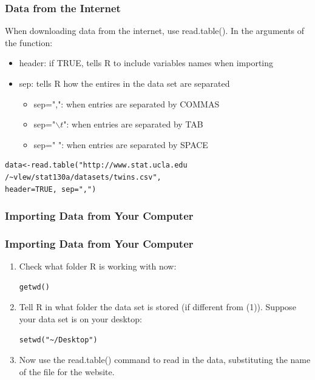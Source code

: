\begin{frame}[fragile]
  \frametitle{Data from the Internet}

 When downloading data from the internet, use \ttfamily read.table(). \normalfont  In the arguments of the function:
   \begin{itemize}
   \item \ttfamily header: \normalfont if TRUE, tells R to include variables names when importing
   \item \ttfamily sep: \normalfont tells R how the entires in the data set are separated
     \begin{itemize}
       \item \ttfamily sep=",": \normalfont when entries are separated by COMMAS
       \item \ttfamily sep="$\backslash t$": \normalfont when entries are separated by TAB
       \item \ttfamily sep=" ": \normalfont when entries are separated by SPACE
     \end{itemize}
    \end{itemize}
    	\begin{lstlisting}
data<-read.table("http://www.stat.ucla.edu
/~vlew/stat130a/datasets/twins.csv", 
header=TRUE, sep=",")
	\end{lstlisting}
\normalfont
\normalsize
\end{frame}



\subsubsection{Importing Data from Your Computer}

\begin{frame}[fragile]
 \frametitle{Importing Data from Your Computer}
     \begin{enumerate}
  	\item Check what folder R is working with now: \\
		\begin{lstlisting}
getwd()
		\end{lstlisting}

  	\item Tell R in what folder the data set is stored (if different from (1)).  Suppose your data set is on your desktop: \\
	\begin{lstlisting}
setwd("~/Desktop")
	\end{lstlisting}

	\item Now use the \ttfamily read.table() \normalfont command to read in the data, substituting the name of the file for the website.
     \end{enumerate}
\end{frame}

